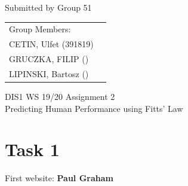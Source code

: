 \documentclass[a4paper,12pt,oneside]{scrreprt}
\begin{document}
\begin{center}
	Submitted by Group 51
	
	\bigskip
	
	\begin{tabular}{ll}
	Group Members: \\
	CETIN, Ulfet (391819) \\
	GRUCZKA, FILIP () \\
	LIPINSKI, Bartosz () \\
	\end{tabular}

	\bigskip
	
	DIS1 WS 19/20 Assignment 2\\
	Predicting Human Performance using Fitts' Law
	
\end{center}

\section*{Task 1}

First website: \textbf{Paul Graham}

%
\end{document}
